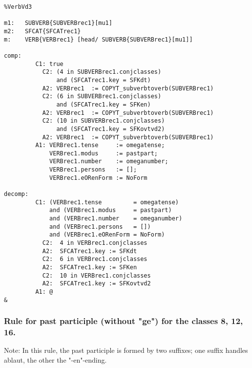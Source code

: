 \begin{verbatim}
%VerbVd3 

m1:   SUBVERB{SUBVERBrec1}[mu1]
m2:   SFCAT{SFCATrec1}
m:    VERB{VERBrec1} [head/ SUBVERB{SUBVERBrec1}[mu1]]

comp:
         C1: true
           C2: (4 in SUBVERBrec1.conjclasses)
               and (SFCATrec1.key = SFKdt) 
           A2: VERBrec1  := COPYT_subverbtoverb(SUBVERBrec1)
           C2: (6 in SUBVERBrec1.conjclasses)
               and (SFCATrec1.key = SFKen) 
           A2: VERBrec1  := COPYT_subverbtoverb(SUBVERBrec1)
           C2: (10 in SUBVERBrec1.conjclasses)
               and (SFCATrec1.key = SFKovtvd2) 
           A2: VERBrec1  := COPYT_subverbtoverb(SUBVERBrec1)
         A1: VERBrec1.tense     := omegatense;
             VERBrec1.modus     := pastpart;
             VERBrec1.number    := omeganumber;
             VERBrec1.persons   := [];
             VERBrec1.eORenForm := NoForm

decomp:
         C1: (VERBrec1.tense         = omegatense) 
             and (VERBrec1.modus     = pastpart)
             and (VERBrec1.number    = omeganumber)
             and (VERBrec1.persons   = []) 
             and (VERBrec1.eORenForm = NoForm) 
           C2:  4 in VERBrec1.conjclasses 
           A2:  SFCATrec1.key := SFKdt
           C2:  6 in VERBrec1.conjclasses
           A2:  SFCATrec1.key := SFKen
           C2:  10 in VERBrec1.conjclasses
           A2:  SFCATrec1.key := SFKovtvd2
         A1: @
&
\end{verbatim}
\newpage
\subsubsection{Rule for past participle (without "ge") for the classes  8, 12, 16.}

Note: In this rule, the past participle is formed by two suffixes; one suffix
handles ablaut, the other the "-en"-ending.

